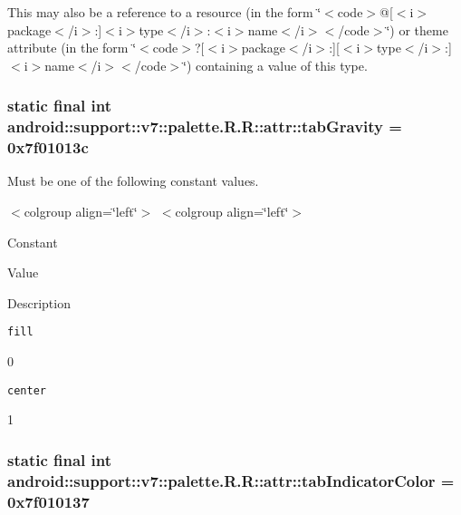This may also be a reference to a resource (in the form \char`\"{}$<$code$>$@\mbox{[}$<$i$>$package$<$/i$>$:\mbox{]}$<$i$>$type$<$/i$>$:$<$i$>$name$<$/i$>$$<$/code$>$\char`\"{}) or theme attribute (in the form \char`\"{}$<$code$>$?\mbox{[}$<$i$>$package$<$/i$>$:\mbox{]}\mbox{[}$<$i$>$type$<$/i$>$:\mbox{]}$<$i$>$name$<$/i$>$$<$/code$>$\char`\"{}) containing a value of this type. \hypertarget{classandroid_1_1support_1_1v7_1_1palette_1_1_r_1_1attr_df46a500fa7df93ee0716492bc94c261}{
\subsubsection[{tabGravity}]{\setlength{\rightskip}{0pt plus 5cm}static final int android::support::v7::palette.R.R::attr::tabGravity = 0x7f01013c}}
\label{classandroid_1_1support_1_1v7_1_1palette_1_1_r_1_1attr_df46a500fa7df93ee0716492bc94c261}


Must be one of the following constant values. \begin{TabularC}{0}
\hline
\end{TabularC}
$<$colgroup align=\char`\"{}left\char`\"{}$>$ $<$colgroup align=\char`\"{}left\char`\"{}$>$ 

Constant

Value

Description 

{\tt fill}

0

{\tt center}

1\hypertarget{classandroid_1_1support_1_1v7_1_1palette_1_1_r_1_1attr_a686289b1972f5e26bb308f0cac441d0}{
\subsubsection[{tabIndicatorColor}]{\setlength{\rightskip}{0pt plus 5cm}static final int android::support::v7::palette.R.R::attr::tabIndicatorColor = 0x7f010137}}
\label{classandroid_1_1support_1_1v7_1_1palette_1_1_r_1_1attr_a686289b1972f5e26bb308f0cac441d0}


